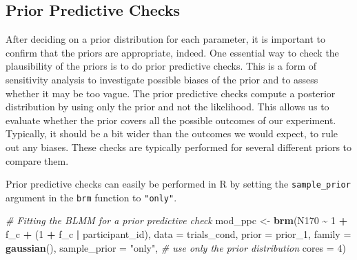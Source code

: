 \documentclass[
  doc,12pt,floatsintext]{apa7}
\newenvironment{Shaded}{\begin{snugshade}}{\end{snugshade}}
\newcommand{\AttributeTok}[1]{\textcolor[rgb]{0.13,0.29,0.53}{#1}}
\newcommand{\CommentTok}[1]{\textcolor[rgb]{0.56,0.35,0.01}{\textit{#1}}}
\newcommand{\DecValTok}[1]{\textcolor[rgb]{0.00,0.00,0.81}{#1}}
\newcommand{\FunctionTok}[1]{\textcolor[rgb]{0.13,0.29,0.53}{\textbf{#1}}}
\newcommand{\NormalTok}[1]{#1}
\newcommand{\OtherTok}[1]{\textcolor[rgb]{0.56,0.35,0.01}{#1}}
\newcommand{\SpecialCharTok}[1]{\textcolor[rgb]{0.81,0.36,0.00}{\textbf{#1}}}
\newcommand{\StringTok}[1]{\textcolor[rgb]{0.31,0.60,0.02}{#1}}
\begin{document}
\subsection{Prior Predictive Checks}\label{prior-predictive-checks}

After deciding on a prior distribution for each parameter, it is important to confirm that the priors are appropriate, indeed. One essential way to check the plausibility of the priors is to do prior predictive checks. This is a form of sensitivity analysis to investigate possible biases of the prior and to assess whether it may be too vague. The prior predictive checks compute a posterior distribution by using only the prior and not the likelihood. This allows us to evaluate whether the prior covers all the possible outcomes of our experiment. Typically, it should be a bit wider than the outcomes we would expect, to rule out any biases. These checks are typically performed for several different priors to compare them.

Prior predictive checks can easily be performed in R by setting the \texttt{sample\_prior} argument in the \texttt{brm} function to \texttt{"only"}.

\begin{Shaded}
\begin{Highlighting}[]
\CommentTok{\# Fitting the BLMM for a prior predictive check}
\NormalTok{mod\_ppc }\OtherTok{\textless{}{-}} \FunctionTok{brm}\NormalTok{(N170 }\SpecialCharTok{\textasciitilde{}} \DecValTok{1} \SpecialCharTok{+}\NormalTok{ f\_c }\SpecialCharTok{+}\NormalTok{ (}\DecValTok{1} \SpecialCharTok{+}\NormalTok{ f\_c }\SpecialCharTok{|}\NormalTok{ participant\_id),}
               \AttributeTok{data =}\NormalTok{ trials\_cond, }
               \AttributeTok{prior =}\NormalTok{ prior\_1,}
               \AttributeTok{family =} \FunctionTok{gaussian}\NormalTok{(),}
               \AttributeTok{sample\_prior =} \StringTok{"only"}\NormalTok{, }\CommentTok{\# use only the prior distribution}
               \AttributeTok{cores =} \DecValTok{4}\NormalTok{) }
\end{Highlighting}
\end{Shaded}
\end{document}

